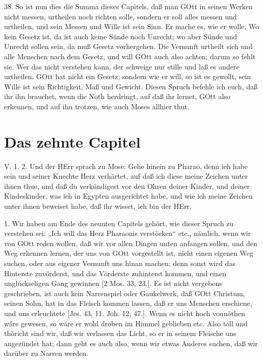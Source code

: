 38. So ist nun dies die Summa dieses Capitels, daß man GOtt in seinen Werken nicht messen, urtheilen noch richten solle, sondern er soll alles messen und urtheilen, und sein Messen und Wille ist sein Sinn. Er mache es, wie er wolle, Wo kein Gesetz ist, da ist auch keine Sünde noch Unrecht; wo aber Sünde und Unrecht sollen sein, da muß Gesetz vorhergehen. Die Vernunft urtheilt sich und alle Menschen nach dem Gesetz, und will GOtt auch also achten; darum so fehlt sie. Wer das nicht verstehen kann, der schweige nur stille und laß es andere urtheilen. GOtt hat nicht ein Gesetz; sondern wie er will, so ist es gewollt, sein Wille ist sein Richtigkeit, Maß und Gewicht. Diesen Spruch befehle ich euch, daß ihr ihn brauchet, wenn die Noth herdringt, auf daß ihr lernet, GOtt also erkennen, und auf ihn trotzen, wie auch Moses allhier thut.

\section{Das zehnte Capitel}

\begin{schriftzitat}
V. 1. 2. Und der HErr sprach zu Mose: Gehe hinein zu Pharao, denn ich habe sein und seiner Knechte Herz verhärtet, auf daß ich diese meine Zeichen unter ihnen thue, und daß du verkündigest vor den Ohren deiner Kinder, und deiner Kindeskinder, was ich in Egypten ausgerichtet habe, und wie ich meine Zeichen unter ihnen beweiset habe, daß ihr wisset, ich bin der HErr.
\end{schriftzitat}

1. Wir haben am Ende des neunten Capitels gehört, wie dieser Spruch zu verstehen sei: „Ich will das Herz Pharaonis verstöcken“ etc., nämlich, wenn wir von GOtt reden wollen, daß wir vor allen Dingen unten anfangen sollen, und den Weg erkennen lernen, der uns von GOtt vorgestellt ist, nicht einen eigenen Weg suchen, oder aus eigener Vernunft uns hinan machen; denn sonst wird das Hinterste zuvörderst, und das Vörderste zuhinterst kommen, und einen unglückseligen Gang gewinnen [2 Mos. 33, 23.]. Es ist nicht vergebens geschrieben, ist auch kein Narrenspiel oder Gaukelwerk, daß GOtt Christum, seinen Sohn, hat in das Fleisch kommen lassen, daß er uns Menschen erschiene, und uns erleuchtete [Jes. 43, 11. Joh. 12, 47.]. Wenn es nicht hoch vonnöthen wäre gewesen, so wäre er wohl droben im Himmel geblieben etc. Also toll und thöricht sind wir, daß wir verlassen das Licht, so er in seinem Fleische uns angezündet hat; dann geht es auch also, wenn wir etwas Anderes suchen, daß wir darüber zu Narren werden.

